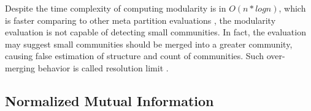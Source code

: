 \documentclass[12pt]{article}
\begin{document}
\bigbreak

Despite the time complexity of computing modularity is in $O(n*log n)$, which is faster comparing to other meta partition evaluations \cite{2, 12}, the modularity evaluation is not capable of detecting small communities. In fact, the evaluation may suggest small communities should be merged into a greater community, causing false estimation of structure and count of communities. Such over-merging behavior is called resolution limit \cite{13}.


\subsection{Normalized Mutual Information}

\end{document}

